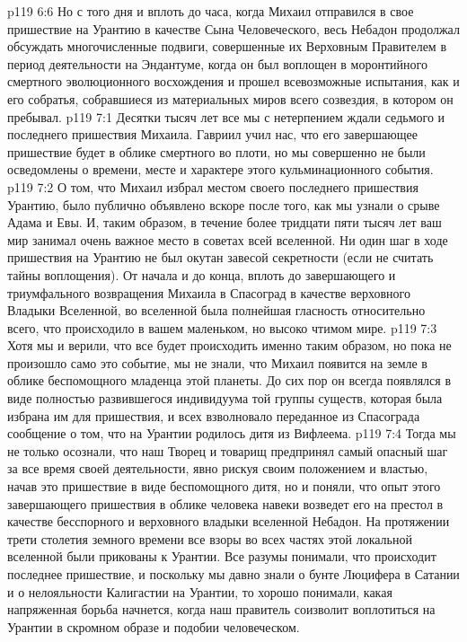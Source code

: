 \vs p119 6:6 Но с того дня и вплоть до часа, когда Михаил отправился в свое пришествие на Урантию в качестве Сына Человеческого, весь Небадон продолжал обсуждать многочисленные подвиги, совершенные их Верховным Правителем в период деятельности на Эндантуме, когда он был воплощен в моронтийного смертного эволюционного восхождения и прошел всевозможные испытания, как и его собратья, собравшиеся из материальных миров всего созвездия, в котором он пребывал.
\vs p119 7:1 Десятки тысяч лет все мы с нетерпением ждали седьмого и последнего пришествия Михаила. Гавриил учил нас, что его завершающее пришествие будет в облике смертного во плоти, но мы совершенно не были осведомлены о времени, месте и характере этого кульминационного события.
\vs p119 7:2 О том, что Михаил избрал местом своего последнего пришествия Урантию, было публично объявлено вскоре после того, как мы узнали о срыве Адама и Евы. И, таким образом, в течение более тридцати пяти тысяч лет ваш мир занимал очень важное место в советах всей вселенной. Ни один шаг в ходе пришествия на Урантию не был окутан завесой секретности (если не считать тайны воплощения). От начала и до конца, вплоть до завершающего и триумфального возвращения Михаила в Спасоград в качестве верховного Владыки Вселенной, во вселенной была полнейшая гласность относительно всего, что происходило в вашем маленьком, но высоко чтимом мире.
\vs p119 7:3 \pc Хотя мы и верили, что все будет происходить именно таким образом, но пока не произошло само это событие, мы не знали, что Михаил появится на земле в облике беспомощного младенца этой планеты. До сих пор он всегда появлялся в виде полностью развившегося индивидуума той группы существ, которая была избрана им для пришествия, и всех взволновало переданное из Спасограда сообщение о том, что на Урантии родилось дитя из Вифлеема.
\vs p119 7:4 Тогда мы не только осознали, что наш Творец и товарищ предпринял самый опасный шаг за все время своей деятельности, явно рискуя своим положением и властью, начав это пришествие в виде беспомощного дитя, но и поняли, что опыт этого завершающего пришествия в облике человека навеки возведет его на престол в качестве бесспорного и верховного владыки вселенной Небадон. На протяжении трети столетия земного времени все взоры во всех частях этой локальной вселенной были прикованы к Урантии. Все разумы понимали, что происходит последнее пришествие, и поскольку мы давно знали о бунте Люцифера в Сатании и о нелояльности Калигастии на Урантии, то хорошо понимали, какая напряженная борьба начнется, когда наш правитель соизволит воплотиться на Урантии в скромном образе и подобии человеческом.
